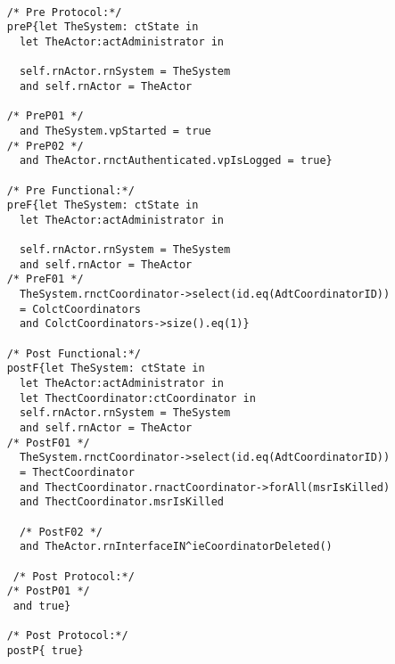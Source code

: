 	\scriptsize
	\vspace{0.5cm}
	\begin{lstlisting}[style=MessirStyle,firstnumber=auto,captionpos=b,caption={\msrmessir (MCL-oriented) specification of the operation \emph{oeDeleteCoordinator}.},label=OM-actAdministrator-oeDeleteCoordinator-MCL-LST]

	/* Pre Protocol:*/ 
	preP{let TheSystem: ctState in
	  let TheActor:actAdministrator in
	  
	  self.rnActor.rnSystem = TheSystem
	  and self.rnActor = TheActor
	  
	/* PreP01 */
	  and TheSystem.vpStarted = true
	/* PreP02 */
	  and TheActor.rnctAuthenticated.vpIsLogged = true}
	
	/* Pre Functional:*/
	preF{let TheSystem: ctState in
	  let TheActor:actAdministrator in
	   
	  self.rnActor.rnSystem = TheSystem
	  and self.rnActor = TheActor
	/* PreF01 */
	  TheSystem.rnctCoordinator->select(id.eq(AdtCoordinatorID))
	  = ColctCoordinators
	  and ColctCoordinators->size().eq(1)}
	
	/* Post Functional:*/ 
	postF{let TheSystem: ctState in
	  let TheActor:actAdministrator in
	  let ThectCoordinator:ctCoordinator in
	  self.rnActor.rnSystem = TheSystem
	  and self.rnActor = TheActor
	/* PostF01 */
	  TheSystem.rnctCoordinator->select(id.eq(AdtCoordinatorID))
	  = ThectCoordinator
	  and ThectCoordinator.rnactCoordinator->forAll(msrIsKilled)
	  and ThectCoordinator.msrIsKilled
	 
	  /* PostF02 */
	  and TheActor.rnInterfaceIN^ieCoordinatorDeleted()
	
	 /* Post Protocol:*/
	/* PostP01 */
	 and true}
	
	/* Post Protocol:*/ 
	postP{ true}
	
	\end{lstlisting}
	\normalsize 
	
	
	
	





